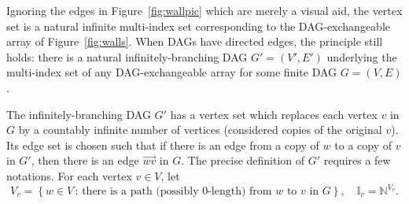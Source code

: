 \documentclass[AHL,Unicode,longabstracts,published]{cedram}
\begin{document}
\begin{exam}\label{ex:infdag}
Ignoring the edges in Figure~\ref{fig:wallpic} which are merely a visual aid, the vertex set is a natural infinite multi-index set corresponding to the DAG-exchangeable array of Figure~\ref{fig:walls}. When DAGs have directed edges, the principle still holds: there is a natural infinitely-branching DAG $G'=(V',E')$ underlying the multi-index set of any DAG-exchangeable array for some finite DAG $G=(V,E)$.


The infinitely-branching DAG $G'$ has a vertex set which replaces each vertex $v$ in $G$ by a countably infinite number of vertices (considered copies of the original $v$). Its edge set is chosen such that if there is an edge from a copy of $w$ to a copy of $v$ in $G'$, then there is an edge $\overrightarrow{wv}$ in $G$. The precise definition of $G'$ requires a few notations. For each vertex $v \in V$, let
\[
V_v = \left\{w \in V\,:\,\text{there is a path (possibly 0-length) from } w \text{ to } v \text{ in }G\right\},\quad
\mathbb{I}_v = \mathbb{N}^{V_v}.
\]



\end{exam}
\end{document}
